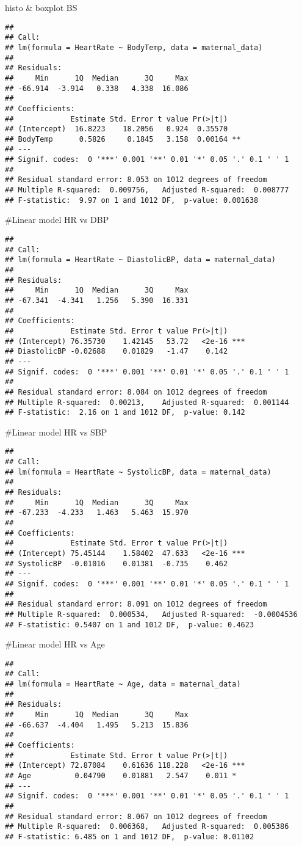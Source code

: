 \documentclass[
  ignorenonframetext,
]{beamer}
\begin{document}
\begin{frame}[fragile]{histo \& boxplot BS}
\begin{verbatim}
## 
## Call:
## lm(formula = HeartRate ~ BodyTemp, data = maternal_data)
## 
## Residuals:
##     Min      1Q  Median      3Q     Max 
## -66.914  -3.914   0.338   4.338  16.086 
## 
## Coefficients:
##             Estimate Std. Error t value Pr(>|t|)   
## (Intercept)  16.8223    18.2056   0.924  0.35570   
## BodyTemp      0.5826     0.1845   3.158  0.00164 **
## ---
## Signif. codes:  0 '***' 0.001 '**' 0.01 '*' 0.05 '.' 0.1 ' ' 1
## 
## Residual standard error: 8.053 on 1012 degrees of freedom
## Multiple R-squared:  0.009756,   Adjusted R-squared:  0.008777 
## F-statistic:  9.97 on 1 and 1012 DF,  p-value: 0.001638
\end{verbatim}

\#Linear model HR vs DBP

\begin{verbatim}
## 
## Call:
## lm(formula = HeartRate ~ DiastolicBP, data = maternal_data)
## 
## Residuals:
##     Min      1Q  Median      3Q     Max 
## -67.341  -4.341   1.256   5.390  16.331 
## 
## Coefficients:
##             Estimate Std. Error t value Pr(>|t|)    
## (Intercept) 76.35730    1.42145   53.72   <2e-16 ***
## DiastolicBP -0.02688    0.01829   -1.47    0.142    
## ---
## Signif. codes:  0 '***' 0.001 '**' 0.01 '*' 0.05 '.' 0.1 ' ' 1
## 
## Residual standard error: 8.084 on 1012 degrees of freedom
## Multiple R-squared:  0.00213,    Adjusted R-squared:  0.001144 
## F-statistic:  2.16 on 1 and 1012 DF,  p-value: 0.142
\end{verbatim}

\#Linear model HR vs SBP

\begin{verbatim}
## 
## Call:
## lm(formula = HeartRate ~ SystolicBP, data = maternal_data)
## 
## Residuals:
##     Min      1Q  Median      3Q     Max 
## -67.233  -4.233   1.463   5.463  15.970 
## 
## Coefficients:
##             Estimate Std. Error t value Pr(>|t|)    
## (Intercept) 75.45144    1.58402  47.633   <2e-16 ***
## SystolicBP  -0.01016    0.01381  -0.735    0.462    
## ---
## Signif. codes:  0 '***' 0.001 '**' 0.01 '*' 0.05 '.' 0.1 ' ' 1
## 
## Residual standard error: 8.091 on 1012 degrees of freedom
## Multiple R-squared:  0.000534,   Adjusted R-squared:  -0.0004536 
## F-statistic: 0.5407 on 1 and 1012 DF,  p-value: 0.4623
\end{verbatim}

\#Linear model HR vs Age

\begin{verbatim}
## 
## Call:
## lm(formula = HeartRate ~ Age, data = maternal_data)
## 
## Residuals:
##     Min      1Q  Median      3Q     Max 
## -66.637  -4.404   1.495   5.213  15.836 
## 
## Coefficients:
##             Estimate Std. Error t value Pr(>|t|)    
## (Intercept) 72.87084    0.61636 118.228   <2e-16 ***
## Age          0.04790    0.01881   2.547    0.011 *  
## ---
## Signif. codes:  0 '***' 0.001 '**' 0.01 '*' 0.05 '.' 0.1 ' ' 1
## 
## Residual standard error: 8.067 on 1012 degrees of freedom
## Multiple R-squared:  0.006368,   Adjusted R-squared:  0.005386 
## F-statistic: 6.485 on 1 and 1012 DF,  p-value: 0.01102
\end{verbatim}


\end{frame}
\end{document}
